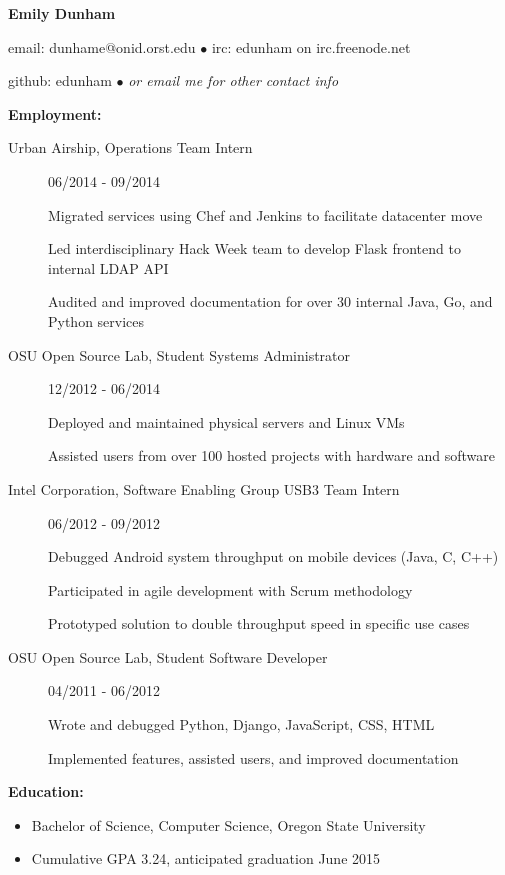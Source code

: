 \documentclass[11pt]{article}
\begin{document}
\centerline{{\LARGE \bf Emily Dunham}}

\bigskip

\centerline{email: dunhame@onid.orst.edu
        $\bullet$
        irc: edunham on irc.freenode.net}
\centerline{github: edunham
        $\bullet$
        \emph{or email me for other contact info}}

\bigskip
\hrulefill
\bigskip

{\Large \bf Employment:}
\begin{description}
\item[Urban Airship, Operations Team Intern]
    \hfill 06/2014 - 09/2014
    
    Migrated services using Chef and Jenkins to facilitate datacenter move

    Led interdisciplinary Hack Week team to develop Flask frontend to internal LDAP API

    Audited and improved documentation for over 30 internal Java, Go, and Python
    services

\item[OSU Open Source Lab, Student Systems Administrator]
    \hfill 12/2012 - 06/2014

    Deployed and maintained physical servers and Linux VMs

    Assisted users from over 100 hosted projects with hardware and software

\item[Intel Corporation, Software Enabling Group USB3 Team Intern]
    \hfill 06/2012 - 09/2012

    Debugged Android system throughput on mobile devices (Java, C, C++)

    Participated in agile development with Scrum methodology

    Prototyped solution to double throughput speed in specific use cases

\item[OSU Open Source Lab, Student Software Developer]
    \hfill 04/2011 - 06/2012

    Wrote and debugged Python, Django, JavaScript, CSS, HTML

    Implemented features, assisted users, and improved documentation
\end{description}

\smallskip
\hrulefill
\bigskip

{\Large \bf Education:}
\begin{itemize}
    \setlength{\itemsep}{1pt}
    \setlength{\parskip}{0pt}
    \setlength{\parsep}{0pt}

    \item Bachelor of Science, Computer Science, Oregon State University
    \item Cumulative GPA 3.24, anticipated graduation June 2015

\end{itemize}
\end{document}
